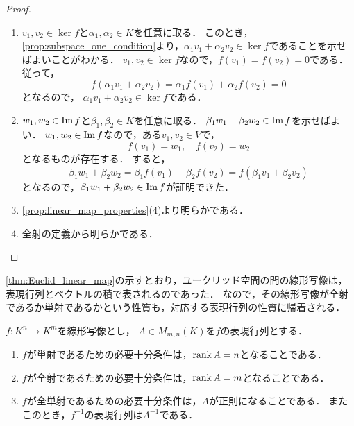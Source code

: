 \begin{proof}
    \begin{enumerate}
        \item $v_1,v_2 \in \ker f$と$\alpha_1,\alpha_2 \in K$を任意に取る．
        このとき，\cref{prop:subspace_one_condition}より，$\alpha_1 v_1 + \alpha_2 v_2 \in \ker f$であることを示せばよいことがわかる．
        $v_1,v_2 \in \ker f$なので，$f(v_1) = f(v_2) = 0$である．従って，
        \[
            f(\alpha_1 v_1 + \alpha_2 v_2) = \alpha_1 f(v_1) + \alpha_2 f(v_2) = 0
        \]
        となるので，
        $\alpha_1 v_1 + \alpha_2 v_2 \in \ker f$である．
        \item $w_1,w_2\in \mathrm{Im}\, f$と$\beta_1,\beta_2 \in K$を任意に取る．
        $\beta_1 w_1 + \beta_2 w_2 \in \mathrm{Im}\, f$を示せばよい．
        $w_1,w_2\in \mathrm{Im}\, f$なので，ある$v_1,v_2 \in V$で，
        \[
            f(v_1) = w_1,\quad f(v_2) = w_2
        \]
        となるものが存在する．
        すると，
        \[
            \beta_1 w_1 + \beta_2 w_2%
            = \beta_1 f(v_1) + \beta_2 f(v_2) %
            = f(\beta_1 v_1 + \beta_2 v_2)
        \]
        となるので，$\beta_1 w_1 + \beta_2 w_2 \in \mathrm{Im}\, f$が証明できた．
        \item \cref{prop:linear_map_properties}(4)より明らかである．
        \item 全射の定義から明らかである．
    \end{enumerate}
\end{proof}
\cref{thm:Euclid_linear_map}の示すとおり，ユークリッド空間の間の線形写像は，表現行列とベクトルの積で表されるのであった．
なので，その線形写像が全射であるか単射であるかという性質も，対応する表現行列の性質に帰着される．
\begin{prop}\label{prop:Euclid_map_properties}
    $f \colon K^n \to K^m$を線形写像とし，
    $A \in M_{m,n}(K)$を$f$の表現行列とする．
    \begin{enumerate}
        \item $f$が単射であるための必要十分条件は，$\mathrm{rank}\, A = n$となることである．
        \item $f$が全射であるための必要十分条件は，$\mathrm{rank}\, A = m$となることである．
        \item $f$が全単射であるための必要十分条件は，$A$が正則になることである．
        またこのとき，$f^{-1}$の表現行列は$A^{-1}$である．
    \end{enumerate}
\end{prop}
